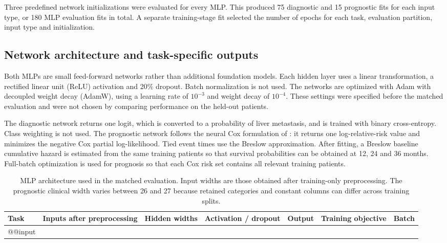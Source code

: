 Three predefined network initializations were evaluated for every MLP.  This
produced 75 diagnostic and 15 prognostic fits for each input type, or 180 MLP
evaluation fits in total.  A separate training-stage fit selected the number of
epochs for each task, evaluation partition, input type and initialization.

\subsection{Network architecture and task-specific outputs}
\label{sec:mlp:architecture}

Both MLPs are small feed-forward networks rather than additional foundation
models.  Each hidden layer uses a linear transformation, a rectified linear
unit (ReLU) activation and 20\% dropout.  Batch normalization is not used.  The
networks are optimized with Adam with decoupled weight decay (AdamW), using a
learning rate of $10^{-3}$ and weight decay of $10^{-4}$.  These settings were
specified before the matched evaluation and were not chosen by comparing
performance on the held-out patients.

The diagnostic network returns one logit, which is converted to a probability
of liver metastasis, and is trained with binary cross-entropy.  Class weighting
is not used.  The prognostic network follows the neural Cox formulation of
\citet{Katzman2018}: it returns one log-relative-risk value and minimizes the
negative Cox partial log-likelihood.  Tied event times use the Breslow
approximation.  After fitting, a Breslow baseline cumulative hazard is estimated
from the same training patients so that survival probabilities can be obtained
at 12, 24 and 36 months.  Full-batch optimization is used for prognosis so that
each Cox risk set contains all relevant training patients.

\begin{table}[htbp]
\centering\scriptsize
\setlength{\tabcolsep}{2.5pt}
\caption{MLP architecture used in the matched evaluation.  Input widths are
those obtained after training-only preprocessing.  The prognostic clinical
width varies between 26 and 27 because retained categories and constant columns
can differ across training splits.}
\label{tab:mlp:architecture}
\begin{tabularx}{\linewidth}{@{}p{1.3cm}p{2.45cm}p{1.15cm}p{1.75cm}Yp{1.85cm}p{1.15cm}@{}}
\toprule
Task & Inputs after preprocessing & Hidden widths & Activation / dropout & Output & Training objective & Batch \\
\midrule
\csname @@input
\bottomrule
\end{tabularx}
\end{table}


